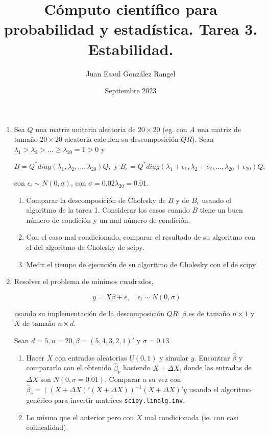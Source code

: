 \documentclass{article}
\title{Cómputo científico para probabilidad y estadística. Tarea 3.\\
Estabilidad.}
\author{Juan Esaul González Rangel}
\date{Septiembre 2023}
\begin{document}
\maketitle


\begin{enumerate}

    \item Sea $Q$ una matriz unitaria aleatoria de $20 \times 20$ (eg. con $A$ una 
    matriz de tamaño $20 \times 20$ aleatoria calculen su descomposición $QR$). 
    Sean $\lambda_1 > \lambda_2 > ... \ge \lambda_{20} = 1 > 0$ y 
    
    \[B = Q^*diag(\lambda_1, \lambda_2, ..., \lambda_{20})Q, \text{ y } B_\epsilon 
    = Q^*diag(\lambda_1+\epsilon_1, \lambda_2+\epsilon_2, ..., \lambda_{20}+\epsilon_{20})Q,\]

con $\epsilon_i \sim N (0, \sigma)$, con $\sigma = 0.02\lambda_{20} = 0.01$.

\begin{enumerate}
    \item Comparar la descomposición de Cholesky de $B$ y de $B_\epsilon$ usando el 
    algoritmo de la tarea 1. Considerar los casos cuando $B$ tiene un buen número de 
    condición y un mal número de condición.
    
    \item Con el caso mal condicionado, comparar el resultado de su algoritmo con 
    el del algoritmo de Cholesky de scipy.
    
    \item Medir el tiempo de ejecución de su algoritmo de Cholesky con el de scipy.
    
\end{enumerate}


    \item Resolver el problema de mínimos cuadrados,
    
        \[y = X\beta + \epsilon, \quad \epsilon_i \sim N (0, \sigma) \]

    usando su implementación de la descomposición $QR$; $\beta$ es de tamaño 
    $n \times 1$ y $X$ de tamaño $n \times d$.
    
    Sean $d = 5, n = 20, \beta = (5, 4, 3, 2, 1)'$ y $\sigma = 0.13$

    \begin{enumerate}
        \item Hacer $X$ con entradas aleatorias $U (0, 1)$ y simular $y$. Encontrar $\hat\beta$
         y compararlo con el obtenido $\hat\beta_p$ haciendo $X + \Delta X$, donde las 
         entradas de $\Delta X$ son $N (0, \sigma = 0.01)$. Comparar a su vez con 
         $\hat\beta_c = ((X + \Delta X)'(X + \Delta X))^{-1}(X + \Delta X)'y$ usando el 
         algoritmo genérico para invertir matrices \texttt{scipy.linalg.inv}.
        \item Lo mismo que el anterior pero con $X$ mal condicionada (ie. con casi colinealidad).
    \end{enumerate}



   
\end{enumerate}




 
\end{document}
